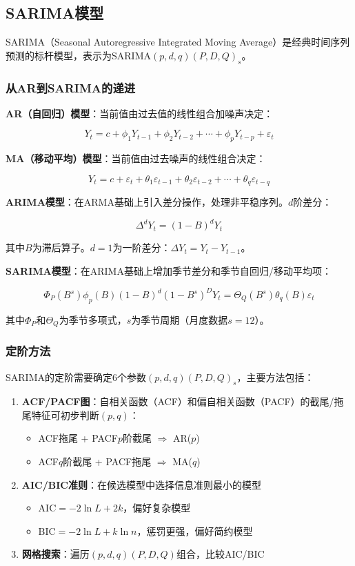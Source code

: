 \subsection{SARIMA模型}

SARIMA（Seasonal Autoregressive Integrated Moving Average）是经典时间序列预测的标杆模型，表示为SARIMA$(p,d,q)(P,D,Q)_s$。

\subsubsection{从AR到SARIMA的递进}

\textbf{AR（自回归）模型}：当前值由过去值的线性组合加噪声决定：

\[
Y_t = c + \phi_1 Y_{t-1} + \phi_2 Y_{t-2} + \cdots + \phi_p Y_{t-p} + \varepsilon_t
\]

\textbf{MA（移动平均）模型}：当前值由过去噪声的线性组合决定：

\[
Y_t = c + \varepsilon_t + \theta_1 \varepsilon_{t-1} + \theta_2 \varepsilon_{t-2} + \cdots + \theta_q \varepsilon_{t-q}
\]

\textbf{ARIMA模型}：在ARMA基础上引入差分操作，处理非平稳序列。$d$阶差分：

\[
\Delta^d Y_t = (1-B)^d Y_t
\]

其中$B$为滞后算子。$d=1$为一阶差分：$\Delta Y_t = Y_t - Y_{t-1}$。

\textbf{SARIMA模型}：在ARIMA基础上增加季节差分和季节自回归/移动平均项：

\[
\Phi_P(B^s)\phi_p(B)(1-B)^d(1-B^s)^D Y_t = \Theta_Q(B^s)\theta_q(B)\varepsilon_t
\]

其中$\Phi_P$和$\Theta_Q$为季节多项式，$s$为季节周期（月度数据$s=12$）。

\subsubsection{定阶方法}

SARIMA的定阶需要确定6个参数$(p,d,q)(P,D,Q)_s$，主要方法包括：

\begin{enumerate}[leftmargin=2em]
  \item \textbf{ACF/PACF图}：自相关函数（ACF）和偏自相关函数（PACF）的截尾/拖尾特征可初步判断$(p,q)$：
    \begin{itemize}
      \item ACF拖尾 + PACF$p$阶截尾 $\Rightarrow$ AR($p$)
      \item ACF$q$阶截尾 + PACF拖尾 $\Rightarrow$ MA($q$)
    \end{itemize}
  \item \textbf{AIC/BIC准则}：在候选模型中选择信息准则最小的模型
    \begin{itemize}
      \item AIC$= -2\ln L + 2k$，偏好复杂模型
      \item BIC$= -2\ln L + k\ln n$，惩罚更强，偏好简约模型
    \end{itemize}
  \item \textbf{网格搜索}：遍历$(p,d,q)(P,D,Q)$组合，比较AIC/BIC
\end{enumerate}

